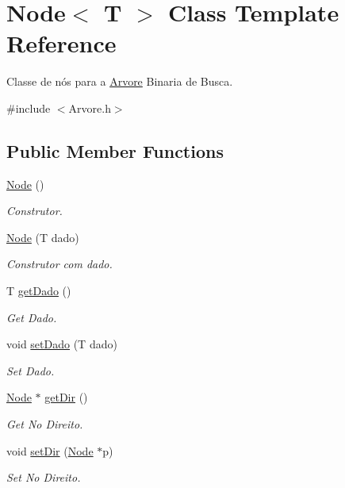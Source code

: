 \hypertarget{classNode}{}\section{Node$<$ T $>$ Class Template Reference}
\label{classNode}


Classe de nós para a \hyperlink{classArvore}{Arvore} Binaria de Busca.  




{\ttfamily \#include $<$Arvore.\+h$>$}

\subsection*{Public Member Functions}
\begin{DoxyCompactItemize}
\item 
\hyperlink{classNode_a0ac1d44cfe588be564acf25485029bd8}{Node} ()
\begin{DoxyCompactList}\small\item\em Construtor. \end{DoxyCompactList}\item 
\hyperlink{classNode_a1ed405745e0be93ff2ef2616405bfdc2}{Node} (T dado)
\begin{DoxyCompactList}\small\item\em Construtor com dado. \end{DoxyCompactList}\item 
T \hyperlink{classNode_abee48d53b678ebe2852ce6262dff8373}{get\+Dado} ()
\begin{DoxyCompactList}\small\item\em Get Dado. \end{DoxyCompactList}\item 
void \hyperlink{classNode_a688af9d8d82a99f49f171146d1c42eee}{set\+Dado} (T dado)
\begin{DoxyCompactList}\small\item\em Set Dado. \end{DoxyCompactList}\item 
\hyperlink{classNode}{Node} $\ast$ \hyperlink{classNode_aedaeaf9b013a27561cec8b27bc0a8f58}{get\+Dir} ()
\begin{DoxyCompactList}\small\item\em Get No Direito. \end{DoxyCompactList}\item 
void \hyperlink{classNode_aee19f2d06c7cdc8b6fa3c0e199f9865a}{set\+Dir} (\hyperlink{classNode}{Node} $\ast$p)
\begin{DoxyCompactList}\small\item\em Set No Direito. \end{DoxyCompactList}\item 

\end{DoxyCompactItemize}
